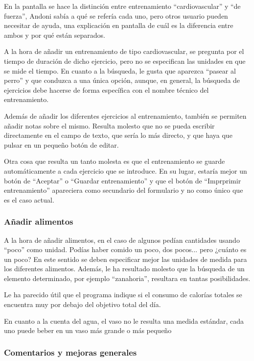 \documentclass[a4paper]{article}
\begin{document}
			En la pantalla se hace la distinción entre entrenamiento ``cardiovascular'' y ``de fuerza'', Andoni sabía a qué se refería cada uno, pero otros usuario pueden necesitar de ayuda, una explicación en pantalla de cuál es la diferencia entre ambos y por qué están separados.
			
			A la hora de añadir un entrenamiento de tipo cardiovascular, se pregunta por el tiempo de duración de dicho ejercicio, pero no se especifican las unidades en que se mide el tiempo. En cuanto a la búsqueda, le gusta que aparezca ``pasear al perro'' y que conduzca a una única opción, aunque, en general, la búsqueda de ejercicios debe hacerse de forma específica con el nombre técnico del entrenamiento.
			
			Además de añadir los diferentes ejercicios al entrenamiento, también se permiten añadir notas sobre el mismo. Resulta molesto que no se pueda escribir directamente en el campo de texto, que sería lo más directo, y que haya que pulsar en un pequeño botón de editar.
			
			Otra cosa que resulta un tanto molesta es que el entrenamiento se guarde automáticamente a cada ejercicio que se introduce. En su lugar, estaría mejor un botón de ``Aceptar'' o ``Guardar entrenamiento'' y que el botón de ``Imprprimir entrenamiento'' apareciera como secundario del formulario y no como único que es el caso actual.
			
			\subsubsection*{Añadir alimentos}
			
			A la hora de añadir alimentos, en el caso de algunos pedían cantidades usando ``poco'' como unidad. Podías haber comido un poco, dos pocos... pero ¿cuánto es un poco? En este sentido se deben especificar mejor las unidades de medida para los diferentes alimentos. Además, le ha resultado molesto que la búsqueda de un elemento determinado, por ejemplo ``zanahoria'', resultara en tantas posibilidades.
			
			Le ha parecido útil que el programa indique si el consumo de calorías totales se encuentra muy por debajo del objetivo total del día.
			
			En cuanto a la cuenta del agua, el vaso no le resulta una medida estándar, cada uno puede beber en un vaso más grande o más pequeño
			
			\subsubsection*{Comentarios y mejoras generales}
			
\end{document}
